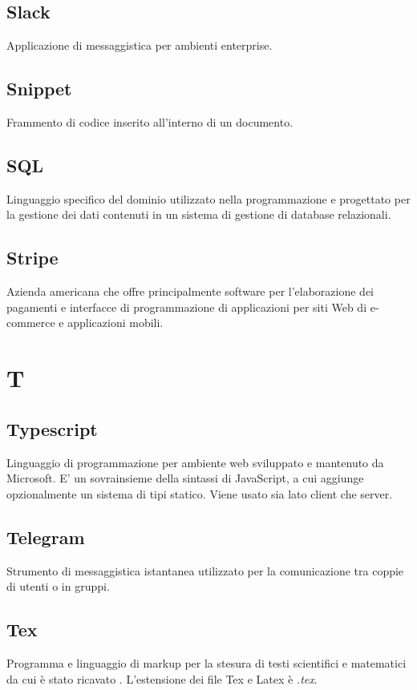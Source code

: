 \subsection*{Slack}
Applicazione di messaggistica per ambienti enterprise.

\subsection*{Snippet}
Frammento di codice inserito all'interno di un documento.

\subsection*{SQL}
Linguaggio specifico del dominio utilizzato nella programmazione e progettato per la gestione dei dati contenuti in un sistema di gestione di database relazionali.

\subsection*{Stripe}
Azienda americana che offre principalmente software per l'elaborazione dei pagamenti e interfacce di programmazione di applicazioni per siti Web di e-commerce e applicazioni mobili.

\newpage
\section{T}
\subsection*{Typescript}
Linguaggio di programmazione per ambiente web sviluppato e mantenuto da Microsoft. E' un sovrainsieme della sintassi di JavaScript, a cui aggiunge opzionalmente un sistema di tipi statico. Viene usato sia lato client che server.

\subsection*{Telegram}
Strumento di messaggistica istantanea utilizzato per la comunicazione tra coppie di utenti o in gruppi.

\subsection*{Tex}
Programma e linguaggio di markup per la stesura di testi scientifici e matematici da cui è stato ricavato . L'estensione dei file Tex e Latex è \textit{.tex}.

